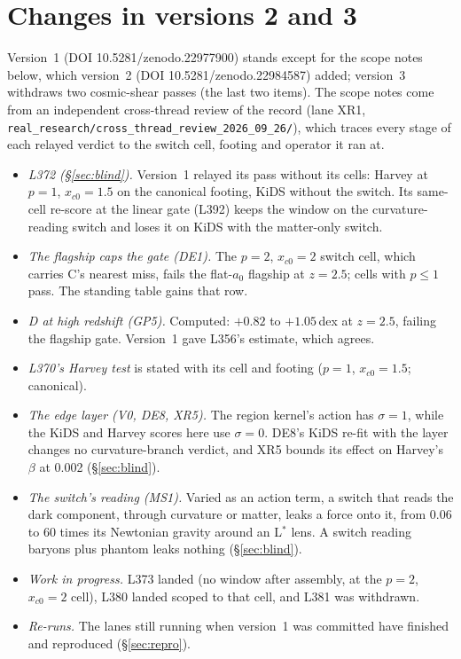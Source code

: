 \documentclass[10pt]{article}
\newcommand{\fpath}[1]{\nolinkurl{#1}}
\begin{document}
\section{Changes in versions 2 and 3}\label{sec:v2}
Version~1 (DOI 10.5281/zenodo.22977900) stands except for the scope notes below, which version~2 (DOI 10.5281/zenodo.22984587) added; version~3 withdraws two cosmic-shear passes (the last two items). The scope notes come from an independent cross-thread review of the record (lane XR1, \fpath{real_research/cross_thread_review_2026_09_26/}), which traces every stage of each relayed verdict to the switch cell, footing and operator it ran at.
\begin{itemize}
\item \emph{L372 (\S\ref{sec:blind}).} Version~1 relayed its pass without its cells: Harvey at $p=1$, $x_{c0}=1.5$ on the canonical footing, KiDS without the switch. Its same-cell re-score at the linear gate (L392) keeps the window on the curvature-reading switch and loses it on KiDS with the matter-only switch.
\item \emph{The flagship caps the gate (DE1).} The $p=2$, $x_{c0}=2$ switch cell, which carries C's nearest miss, fails the flat-$a_0$ flagship at $z=2.5$; cells with $p\leq1$ pass. The standing table gains that row.
\item \emph{D at high redshift (GP5).} Computed: $+0.82$ to $+1.05$\,dex at $z=2.5$, failing the flagship gate. Version~1 gave L356's estimate, which agrees.
\item \emph{L370's Harvey test} is stated with its cell and footing ($p=1$, $x_{c0}=1.5$; canonical).
\item \emph{The edge layer (V0, DE8, XR5).} The region kernel's action has $\sigma=1$, while the KiDS and Harvey scores here use $\sigma=0$. DE8's KiDS re-fit with the layer changes no curvature-branch verdict, and XR5 bounds its effect on Harvey's $\beta$ at 0.002 (\S\ref{sec:blind}).
\item \emph{The switch's reading (MS1).} Varied as an action term, a switch that reads the dark component, through curvature or matter, leaks a force onto it, from 0.06 to 60 times its Newtonian gravity around an L$^*$ lens. A switch reading baryons plus phantom leaks nothing (\S\ref{sec:blind}).
\item \emph{Work in progress.} L373 landed (no window after assembly, at the $p=2$, $x_{c0}=2$ cell), L380 landed scoped to that cell, and L381 was withdrawn.
\item \emph{Re-runs.} The lanes still running when version~1 was committed have finished and reproduced (\S\ref{sec:repro}).

\end{itemize}
\end{document}
